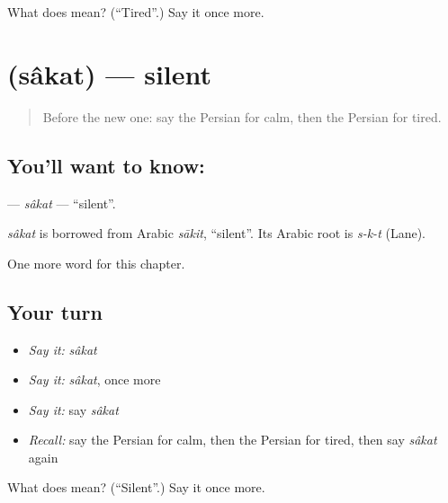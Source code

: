 \begin{tcolorbox}[breakable,colback=teal!4,colframe=teal!35!black,title={Before you move on}]
What does  mean? (\textquotedblleft{}Tired\textquotedblright{}.) Say it once more.
\end{tcolorbox}
\section[\texorpdfstring{\fa{ساکت} (sâkat)}{ساکت (sâkat)}]{ (sâkat) — silent}

\label{lesson:FA-C129-sakat}



\begin{quote}
Before the new one: say the Persian for calm, then the Persian for tired.
\end{quote}

\subsection*{You'll want to know: }
\textbf{} — \emph{sâkat} — \textquotedblleft{}silent\textquotedblright{}.

\begin{cousinweb}
\emph{sâkat} is borrowed from Arabic \emph{sākit}, \textquotedblleft{}silent\textquotedblright{}. Its Arabic root is \emph{s-k-t} (Lane).
\end{cousinweb}

\begin{grammarlens}[title={What you've built}]
One more word for this chapter.
\end{grammarlens}

\subsection*{Your turn}
\begin{itemize}
\raggedright
  \item \emph{Say it:} \emph{sâkat}
  \item \emph{Say it:} \emph{sâkat}, once more
  \item \emph{Say it:} say \emph{sâkat}
  \item \emph{Recall:} say the Persian for calm, then the Persian for tired, then say \emph{sâkat} again
\end{itemize}

\begin{tcolorbox}[breakable,colback=teal!4,colframe=teal!35!black,title={Before you move on}]
What does  mean? (\textquotedblleft{}Silent\textquotedblright{}.) Say it once more.
\end{tcolorbox}
